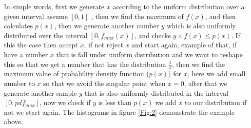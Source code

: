 In simple words, first we generate $x$ according to the uniform distribution over a given interval assume $[0,1]$ 
, then we find the maximum of $f(x)$, and then calculates $p(x)$, then we generate another number $y$ which is also uniformly distributed over the interval $[0,f_{max}(x)]$, and checks  $y \times f(x) \leq p(x)$.
If this the case then accept $x$, if not reject $x$ and start again, example of that, if have a number $x$ that is fall under uniform distribution and we want to reshape this so that we get a number  that has the distribution $\frac{1}{x}$, then we find the maximum value of probability density function ($p(x)$) for $x$, here we add small number to $x$ so that we avoid the singular point when $x = 0$, after that we generate another sample $y$ that is also uniformly distributed in the interval $[0,pdf_{max}]$, 
now we check if $y $ is less than $p(x)$ we add $x$ to our distribution if not we start again. The histograms in figure \ref{Fig:2} demonstrate the example above.   

